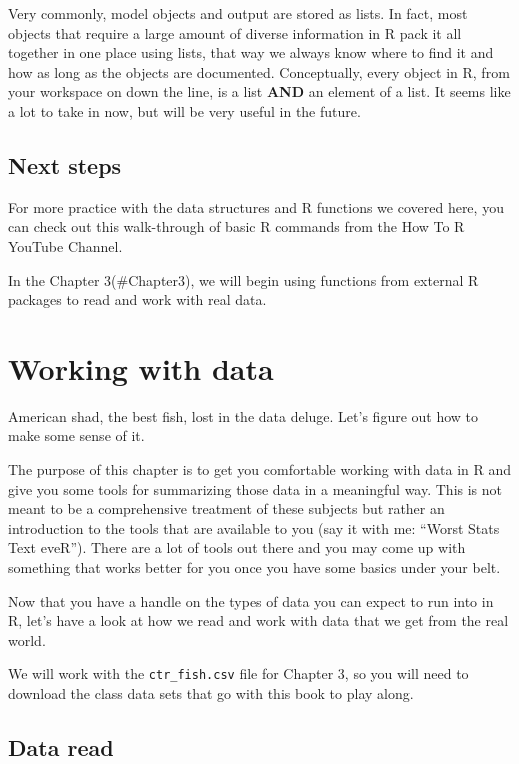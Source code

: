 \documentclass[
]{book}
\begin{document}
Very commonly, model objects and output are stored as lists. In fact, most objects that require a large amount of diverse information in R pack it all together in one place using lists, that way we always know where to find it and how as long as the objects are documented. Conceptually, every object in R, from your workspace on down the line, is a list \textbf{AND} an element of a list. It seems like a lot to take in now, but will be very useful in the future.

\hypertarget{next-steps}{%
\section{Next steps}\label{next-steps}}

For more practice with the data structures and R functions we covered here, you can check out this walk-through of basic R commands from the How To R YouTube Channel.

In the Chapter 3(\#Chapter3), we will begin using functions from external R packages to read and work with real data.

\hypertarget{Chapter3}{%
\chapter{Working with data}\label{Chapter3}}

American shad, the best fish, lost in the data deluge. Let's figure out how to make some sense of it.

The purpose of this chapter is to get you comfortable working with data in R and give you some tools for summarizing those data in a meaningful way. This is not meant to be a comprehensive treatment of these subjects but rather an introduction to the tools that are available to you (say it with me: ``Worst Stats Text eveR''). There are a lot of tools out there and you may come up with something that works better for you once you have some basics under your belt.

Now that you have a handle on the types of data you can expect to run into in R, let's have a look at how we read and work with data that we get from the real world.

We will work with the \texttt{ctr\_fish.csv} file for Chapter 3, so you will need to download the class data sets that go with this book to play along.

\hypertarget{data-read}{%
\section{Data read}\label{data-read}}
\end{document}
